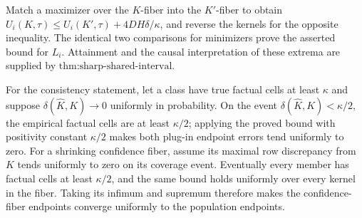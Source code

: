 Match a maximizer over the \(K\)-fiber into the \(K'\)-fiber to obtain \(U_i(K,\tau)\le U_i(K',\tau)+4DH\delta/\kappa\), and reverse the kernels for the opposite inequality.  The identical two comparisons for minimizers prove the asserted bound for \(L_i\).  Attainment and the causal interpretation of these extrema are supplied by \(\text{thm:sharp-shared-interval}\).

For the consistency statement, let a class have true factual cells at least \(\kappa\) and suppose \(\delta(\widehat K,K)\to0\) uniformly in probability.  On the event \(\delta(\widehat K,K)<\kappa/2\), the empirical factual cells are at least \(\kappa/2\); applying the proved bound with positivity constant \(\kappa/2\) makes both plug-in endpoint errors tend uniformly to zero.  For a shrinking confidence fiber, assume its maximal row discrepancy from \(K\) tends uniformly to zero on its coverage event.  Eventually every member has factual cells at least \(\kappa/2\), and the same bound holds uniformly over every kernel in the fiber.  Taking its infimum and supremum therefore makes the confidence-fiber endpoints converge uniformly to the population endpoints.